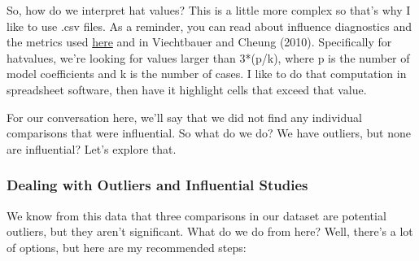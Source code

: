 \documentclass[
]{book}
\begin{document}
So, how do we interpret hat values? This is a little more complex so that's why I like to use .csv files. As a reminder, you can read about influence diagnostics and the metrics used \href{https://wviechtb.github.io/metafor/reference/influence.rma.uni.html}{here} and in Viechtbauer and Cheung (2010)\citep{viechtbauer2010b}. Specifically for hatvalues, we're looking for values larger than 3*(p/k), where p is the number of model coefficients and k is the number of cases\citep{viechtbauera}. I like to do that computation in spreadsheet software, then have it highlight cells that exceed that value.

For our conversation here, we'll say that we did not find any individual comparisons that were influential. So what do we do? We have outliers, but none are influential? Let's explore that.

\hypertarget{dealing-with-outliers-and-influential-studies}{%
\subsubsection{Dealing with Outliers and Influential Studies}\label{dealing-with-outliers-and-influential-studies}}

We know from this data that three comparisons in our dataset are potential outliers, but they aren't significant. What do we do from here? Well, there's a lot of options, but here are my recommended steps:
\end{document}
